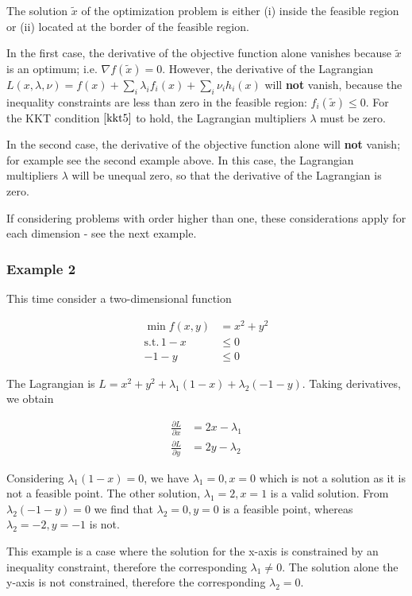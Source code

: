 The solution $\tilde x$ of the optimization problem is either (i) inside the feasible region or (ii) located at the border of the feasible region.

In the first case, the derivative of the objective function alone
vanishes because $\tilde x$ is an optimum; i.e. $\nabla f(\tilde x) = 0$. However, the derivative of the Lagrangian $L(x,\lambda,\nu) = f(x) + \sum_i \lambda_i f_i(x) + \sum_i \nu_i h_i(x)$ will \textbf{not} vanish, because the inequality constraints are less than zero in the feasible region: $f_i(\tilde x)\leq 0$. For the
KKT condition $\eqref{kkt5}$ to hold, the Lagrangian multipliers $\lambda$ must be zero.

In the second case, the derivative of the objective function alone will \textbf{not} vanish; for example see the second example above. In this case, the Lagrangian multipliers $\lambda$ will be unequal zero, so that the derivative of the Lagrangian is zero.

If considering problems with order higher than one, these considerations apply for each dimension - see the next example.

\subsubsection{Example 2}

This time consider a two-dimensional function


\begin{align*}
\min f(x,y) &= x^2 + y^2 \\
\text{s.t.} \, 1-x & \leq 0 \\
-1-y & \leq 0
\end{align*}


The Lagrangian is $L = x^2 + y^2 + \lambda_1(1-x) + \lambda_2(-1-y)$. Taking derivatives, we obtain


\begin{align*}
\frac{\partial L}{\partial x} & = 2x - \lambda_1 \\
\frac{\partial L}{\partial y} & = 2y - \lambda_2
\end{align*}


Considering $\lambda_1(1-x)=0$, we have $\lambda_1=0, x=0$ which is not a solution as it is not a feasible point. The other solution, $\lambda_1=2, x=1$ is a valid solution. From $\lambda_2(-1-y)=0$ we find that $\lambda_2=0, y=0$ is a feasible point, whereas $\lambda_2=-2, y=-1$ is not.

This example is a case where the solution for the x-axis is constrained by an inequality constraint, therefore the corresponding
$\lambda_1 \neq 0$. The solution alone the y-axis is not constrained, therefore the corresponding $\lambda_2 = 0$.

